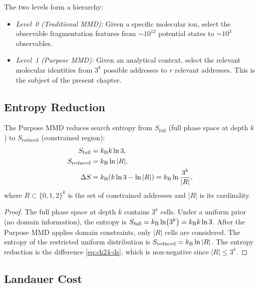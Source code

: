 The two levels form a hierarchy:
\begin{itemize}
  \item \emph{Level~0 (Traditional MMD):} Given a specific molecular ion,
    select the observable fragmentation features from $\sim 10^{12}$ potential
    states to $\sim 10^3$ observables.
  \item \emph{Level~1 (Purpose MMD):} Given an analytical context, select the
    relevant molecular identities from $3^k$ possible addresses to $r$
    relevant addresses.  This is the subject of the present chapter.
\end{itemize}

\subsection{Entropy Reduction}
\label{sec:ch24-entropy}

\begin{theorem}
\label{thm:ch24-mmd-entropy}
The Purpose MMD reduces search entropy from $S_{\mathrm{full}}$ (full phase
space at depth $k$) to $S_{\mathrm{reduced}}$ (constrained region):
\begin{align}
  S_{\mathrm{full}} &= k_{\mathrm{B}} k \ln 3, \label{eq:ch24-sfull} \\
  S_{\mathrm{reduced}} &= k_{\mathrm{B}} \ln |R|, \label{eq:ch24-sreduced} \\
  \Delta S &= k_{\mathrm{B}}(k \ln 3 - \ln |R|) = k_{\mathrm{B}} \ln \frac{3^k}{|R|},
  \label{eq:ch24-ds}
\end{align}
where $R \subset \{0,1,2\}^k$ is the set of constrained addresses and $|R|$
is its cardinality.
\end{theorem}

\begin{proof}
The full phase space at depth $k$ contains $3^k$ cells.  Under a uniform prior
(no domain information), the entropy is $S_{\mathrm{full}} = k_{\mathrm{B}} \ln(3^k) =
k_{\mathrm{B}} k \ln 3$.  After the Purpose MMD applies domain constraints, only $|R|$
cells are considered.  The entropy of the restricted uniform distribution is
$S_{\mathrm{reduced}} = k_{\mathrm{B}} \ln |R|$.  The entropy reduction is the difference
\eqref{eq:ch24-ds}, which is non-negative since $|R| \leq 3^k$.
\end{proof}

\subsection{Landauer Cost}
\label{sec:ch24-landauer}

